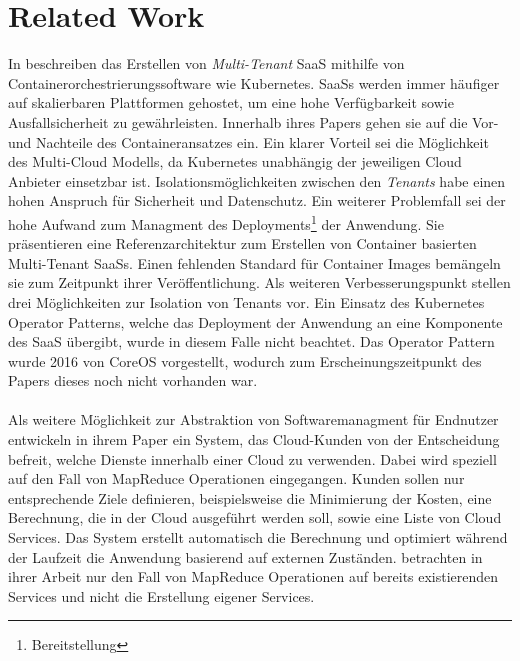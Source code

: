 \section{Related Work}
\label{sec:fazit_ausblick:related_work}

In \cite{Truyen2016} beschreiben \citeauthor{Truyen2016}
das Erstellen von \emph{Multi-Tenant}
\acf{SaaS} mithilfe von Containerorchestrierungssoftware wie Kubernetes.
\acp{SaaS} werden immer häufiger auf skalierbaren Plattformen gehostet, um eine hohe Verfügbarkeit sowie Ausfallsicherheit zu gewährleisten.
Innerhalb ihres Papers gehen sie auf die Vor- und Nachteile des Containeransatzes ein.
Ein klarer Vorteil sei die Möglichkeit des Multi-Cloud Modells, da Kubernetes unabhängig der jeweiligen Cloud Anbieter einsetzbar ist.
Isolationsmöglichkeiten zwischen den \emph{Tenants} habe einen hohen Anspruch für Sicherheit und Datenschutz.
Ein weiterer Problemfall sei der hohe Aufwand zum Managment des Deployments\footnote{Bereitstellung} der Anwendung.
Sie präsentieren eine Referenzarchitektur zum Erstellen von Container basierten Multi-Tenant SaaSs.
Einen fehlenden Standard für Container Images bemängeln sie zum Zeitpunkt ihrer Veröffentlichung.
Als weiteren Verbesserungspunkt stellen \citeauthor{Truyen2016} drei Möglichkeiten zur Isolation von Tenants vor.
Ein Einsatz des Kubernetes Operator Patterns, welche das Deployment der Anwendung an eine Komponente des \acf{SaaS} übergibt,
wurde in diesem Falle nicht beachtet. Das Operator Pattern wurde 2016 von CoreOS vorgestellt, wodurch zum Erscheinungszeitpunkt
des Papers dieses noch nicht vorhanden war.

\paragraph{}
Als weitere Möglichkeit zur Abstraktion von Softwaremanagment für Endnutzer entwickeln \citeauthor{Wieder2012} in ihrem Paper
\cite{Wieder2012} ein System, das Cloud-Kunden von der Entscheidung befreit, welche Dienste innerhalb einer Cloud zu verwenden.
Dabei wird speziell auf den Fall von MapReduce Operationen eingegangen. Kunden sollen nur entsprechende Ziele definieren, beispielsweise
die Minimierung der Kosten, eine Berechnung, die in der Cloud ausgeführt werden soll, sowie eine Liste von Cloud Services.
Das System erstellt automatisch die Berechnung und optimiert während der Laufzeit die Anwendung basierend auf externen Zuständen.
\citeauthor{Wieder2012} betrachten in ihrer Arbeit nur den Fall von MapReduce Operationen auf bereits existierenden Services
und nicht die Erstellung eigener Services.

